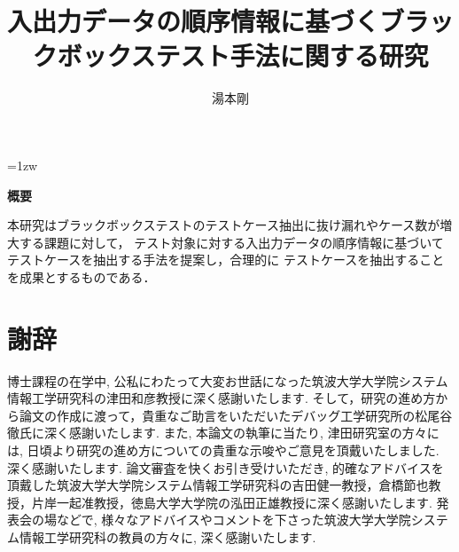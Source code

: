 \documentclass[a4paper,12pt]{jreport}
\title{入出力データの順序情報に基づくブラックボックステスト手法に関する研究}
\author{湯本剛}
\begin{document}
\maketitle
\thispagestyle{empty}
\newpage

\thispagestyle{empty}
\vspace*{20pt plus 1fil}
\parindent=1zw
\noindent
\begin{center}
{\bf 概要}
\vspace{5mm}
\end{center}
本研究はブラックボックステストのテストケース抽出に抜け漏れやケース数が増大する課題に対して，
テスト対象に対する入出力データの順序情報に基づいてテストケースを抽出する手法を提案し，合理的に
テストケースを抽出することを成果とするものである．


\par
\vspace{0pt plus 1fil}
\newpage

\tableofcontents
\listoffigures
\listoftables

\pagebreak \setcounter{page}{1}






%


\chapter*{謝辞}
博士課程の在学中, 公私にわたって大変お世話になった筑波大学大学院システム情報工学研究科の津田和彦教授に深く感謝いたします. そして，研究の進め方から論文の作成に渡って，貴重なご助言をいただいたデバッグ工学研究所の松尾谷徹氏に深く感謝いたします.
また, 本論文の執筆に当たり, 津田研究室の方々には, 日頃より研究の進め方についての貴重な示唆やご意見を頂戴いたしました. 深く感謝いたします.
論文審査を快くお引き受けいただき, 的確なアドバイスを頂戴した筑波大学大学院システム情報工学研究科の吉田健一教授，倉橋節也教授，片岸一起准教授，徳島大学大学院の泓田正雄教授に深く感謝いたします.
発表会の場などで, 様々なアドバイスやコメントを下さった筑波大学大学院システム情報工学研究科の教員の方々に, 深く感謝いたします.
\end{document}

